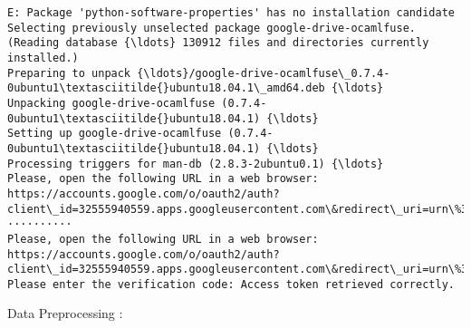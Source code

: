 \documentclass[11pt]{article}
\begin{document}
    \begin{Verbatim}[commandchars=\\\{\}]
E: Package 'python-software-properties' has no installation candidate
Selecting previously unselected package google-drive-ocamlfuse.
(Reading database {\ldots} 130912 files and directories currently installed.)
Preparing to unpack {\ldots}/google-drive-ocamlfuse\_0.7.4-0ubuntu1\textasciitilde{}ubuntu18.04.1\_amd64.deb {\ldots}
Unpacking google-drive-ocamlfuse (0.7.4-0ubuntu1\textasciitilde{}ubuntu18.04.1) {\ldots}
Setting up google-drive-ocamlfuse (0.7.4-0ubuntu1\textasciitilde{}ubuntu18.04.1) {\ldots}
Processing triggers for man-db (2.8.3-2ubuntu0.1) {\ldots}
Please, open the following URL in a web browser: https://accounts.google.com/o/oauth2/auth?client\_id=32555940559.apps.googleusercontent.com\&redirect\_uri=urn\%3Aietf\%3Awg\%3Aoauth\%3A2.0\%3Aoob\&scope=https\%3A\%2F\%2Fwww.googleapis.com\%2Fauth\%2Fdrive\&response\_type=code\&access\_type=offline\&approval\_prompt=force
··········
Please, open the following URL in a web browser: https://accounts.google.com/o/oauth2/auth?client\_id=32555940559.apps.googleusercontent.com\&redirect\_uri=urn\%3Aietf\%3Awg\%3Aoauth\%3A2.0\%3Aoob\&scope=https\%3A\%2F\%2Fwww.googleapis.com\%2Fauth\%2Fdrive\&response\_type=code\&access\_type=offline\&approval\_prompt=force
Please enter the verification code: Access token retrieved correctly.

    \end{Verbatim}

    Data Preprocessing :
\end{document}
